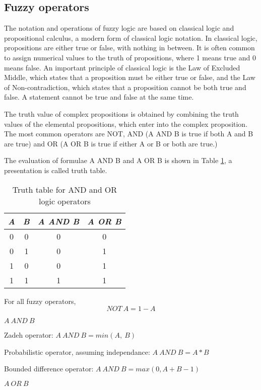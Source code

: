 \subsection{Fuzzy operators}

The notation and operations of fuzzy logic are based on classical logic and propositional calculus, a modern form of classical logic notation. In classical logic, propositions are either true or false, with nothing in between. It is often common to assign numerical values to the truth of propositions, where 1 means true and 0 means false. An important principle of classical logic is the Law of Excluded Middle, which states that a proposition must be either true or false, and the Law of Non-contradiction, which states that a proposition cannot be both true and false. A statement cannot be true and false at the same time.

The truth value of complex propositions is obtained by combining the truth values
of the elemental propositions, which enter into the complex proposition. The most
common operators are NOT, AND (A AND B is true if both A
and B are true) and OR (A OR B is true if either A or B or both are true.)\cite{FesFr}

The evaluation of formulae A AND B and A OR B is shown in Table \ref{table:andor}, a presentation is called truth table.

\begin{table}[ht]
\caption{Truth table for AND and OR logic operators}
\centering
\begin{tabular}{c c c c}    \toprule
\emph{A} & \emph{B} &\emph{A AND B}& \emph{A OR B}   \\\midrule
0    & 0  & 0  & 0  \\ 
0  &1 &0 & 1\\ 
1 & 0 & 0 & 1\\
1  & 1 & 1 & 1 \\
 \hline
\end{tabular}
\label{table:andor}
\end{table}

For all fuzzy operators, 
\[NOT\  A = 1-A\]

\(A \ AND \ B\)

Zadeh operator: \(A \  AND \  B = min(A, \  B)\)

Probabilistic operator, assuming independance: \( A \  AND \  B = A \ast B\)

Bounded difference operator: \(A\  AND \  B = max(0, A+B-1)\)

\(A \  OR \  B\)

